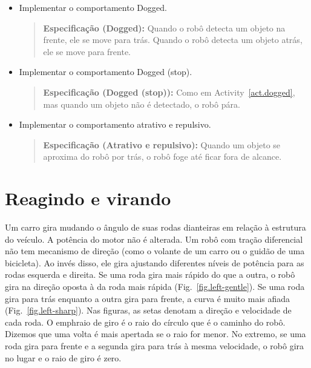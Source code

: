 \begin{framed}
\begin{itemize}
\item Implementar o comportamento Dogged.
\begin{quote}
\normalsize\noindent\textbf{Especificação (Dogged):} Quando o robô detecta um objeto na frente, ele se move para trás. Quando o robô detecta um objeto atrás, ele se move para frente.
\end{quote}
\end{itemize}
\end{framed}

\begin{framed}
\begin{itemize}
\item Implementar o comportamento Dogged (stop).
\begin{quote}
\normalsize\noindent\textbf{Especificação (Dogged (stop)):} Como em Activity~\ref{act.dogged}, mas quando um objeto não é detectado, o robô pára.
\end{quote}
\end{itemize}
\end{framed}

\begin{framed}
\begin{itemize}
\item Implementar o comportamento atrativo e repulsivo.
\begin{quote}
\normalsize\noindent\textbf{Especificação (Atrativo e repulsivo):} Quando um objeto se aproxima do robô por trás, o robô foge até ficar fora de alcance.
\end{quote}
\end{itemize}
\end{framed}

\section{Reagindo e virando}\label{s.turning}

Um carro gira mudando o ângulo de suas rodas dianteiras em relação à estrutura do veículo. A potência do motor não é alterada. Um robô com tração diferencial não tem mecanismo de direção (como o volante de um carro ou o guidão de uma bicicleta). Ao invés disso, ele gira ajustando diferentes níveis de potência para as rodas esquerda e direita. Se uma roda gira mais rápido do que a outra, o robô gira na direção oposta à da roda mais rápida (Fig.~\ref{fig.left-gentle}). Se uma roda gira para trás enquanto a outra gira para frente, a curva é muito mais afiada (Fig.~\ref{fig.left-sharp}). Nas figuras, as setas denotam a direção e velocidade de cada roda. O emph{raio de giro} é o raio do círculo que é o caminho do robô. Dizemos que uma volta é mais apertada se o raio for menor. No extremo, se uma roda gira para frente e a segunda gira para trás à mesma velocidade, o robô gira no lugar e o raio de giro é zero.

